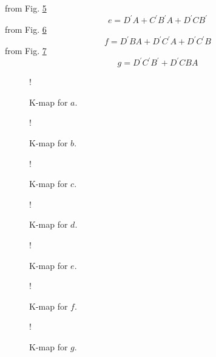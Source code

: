 \documentclass[journal,12pt,twocolumn]{IEEEtran}
\begin{document}
from Fig. \ref{fig:kmap_e}
\begin{equation}
	e = D^{\prime}A+C^{\prime}B^{\prime}A+D^{\prime}CB^{\prime}
\end{equation}
from Fig. \ref{fig:kmap_f}
\begin{equation}
	f = D^{\prime}BA+D^{\prime}C^{\prime}A+D^{\prime}C^{\prime}B
\end{equation}
from Fig. \ref{fig:kmap_g}
\begin{equation}
	g = D^{\prime}C^{\prime}B^{\prime}+D^{\prime}CBA
\end{equation}
\begin{figure}[!h]
	\resizebox {\columnwidth} {!} {
		
	}
	\caption{K-map for $a$.}
	\label{fig:kmap_a}
\end{figure}
\begin{figure}[!h]
	\resizebox {\columnwidth} {!} {
		
	}
	\caption{K-map for $b$.}
	\label{fig:kmap_b}
\end{figure}
\begin{figure}[!h]
	\resizebox {\columnwidth} {!} {
		
	}
	\caption{K-map for $c$.}
	\label{fig:kmap_c}
\end{figure}
\begin{figure}[!h]
	\resizebox {\columnwidth} {!} {
		
	}
	\caption{K-map for $d$.}
	\label{fig:kmap_d}
\end{figure}
\begin{figure}[!h]
	\resizebox {\columnwidth} {!} {
		
	}
	\caption{K-map for $e$.}
	\label{fig:kmap_e}
\end{figure}
\begin{figure}[!h]
	\resizebox {\columnwidth} {!} {
		
	}
	\caption{K-map for $f$.}
	\label{fig:kmap_f}
\end{figure}
\begin{figure}[!h]
	\resizebox {\columnwidth} {!} {
		
	}
	\caption{K-map for $g$.}
	\label{fig:kmap_g}
\end{figure}
\end{document}
